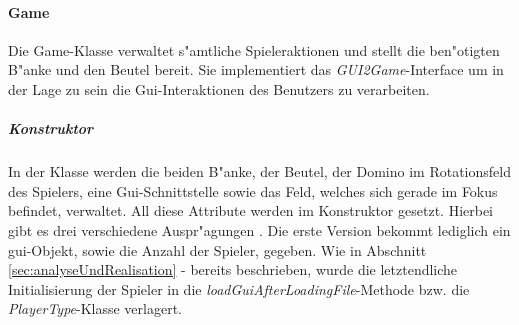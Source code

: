 \paragraph{Game}
\label{par:game}
Die Game-Klasse verwaltet s"amtliche Spieleraktionen und stellt die ben"otigten B"anke und den Beutel bereit. Sie implementiert das \emph{GUI2Game}-Interface um in der Lage zu sein die Gui-Interaktionen des Benutzers zu verarbeiten. 

\subparagraph{Konstruktor}
In der Klasse werden die beiden B"anke, der Beutel, der Domino im Rotationsfeld des Spielers, eine Gui-Schnittstelle sowie das Feld, welches sich gerade im Fokus befindet, verwaltet. All diese Attribute werden im Konstruktor gesetzt. Hierbei gibt es drei verschiedene Auspr"agungen . Die erste Version bekommt lediglich ein gui-Objekt, sowie die Anzahl der Spieler, gegeben. Wie in Abschnitt \ref{sec:analyseUndRealisation} -  bereits beschrieben, wurde die letztendliche Initialisierung der Spieler in die \emph{loadGuiAfterLoadingFile}-Methode bzw. die \emph{PlayerType}-Klasse verlagert. 

